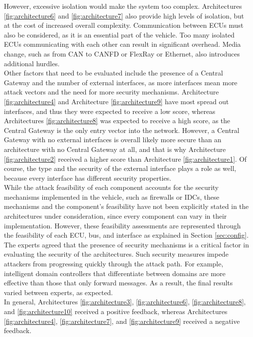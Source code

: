 However, excessive isolation would make the system too complex. 
Architectures \ref{fig:architecture6} and \ref{fig:architecture7} also provide high levels of isolation, but at the cost of increased overall complexity.
Communication between ECUs must also be considered, as it is an essential part of the vehicle. 
Too many isolated ECUs communicating with each other can result in significant overhead. 
Media change, such as from CAN to CANFD or FlexRay or Ethernet, also introduces additional hurdles.\\

Other factors that need to be evaluated include the presence of a Central Gateway and the number of external interfaces, 
as more interfaces mean more attack vectors and the need for more security mechanisms.
Architecture \ref{fig:architecture4} and Architecture \ref{fig:architecture9} have most spread out interfaces, and thus they were expected to receive a low score,
whereas Architectures \ref{fig:architecture8} was expected to receive a high score, as the Central Gateway is the only entry vector into the network.
However, a Central Gateway with no external interfaces is overall likely more secure than an architecture with no Central Gateway at all, and that is why 
Architecture \ref{fig:architecture2} received a higher score than Architecture \ref{fig:architecture1}. 
Of course, the type and the security of the external interface plays a role as well, because every interface has different security properties.\\

While the attack feasibility of each component accounts for the security mechanisms implemented in the vehicle, such as firewalls or IDCs, 
these mechanisms and the component's feasibility have not been explicitly stated in the architectures under consideration, since every component can vary in their implementation.
However, these feasibility assessments are represented through the feasibility of each ECU, bus, and interface as explained in Section \ref{sec:config}.
The experts agreed that the presence of security mechanisms is a critical factor in evaluating the security of the architectures.
Such security measures impede attackers from progressing quickly through the attack path. 
For example, intelligent domain controllers that differentiate between domains are more effective than those that only forward messages.
As a result, the final results varied between experts, as expected.\\

In general, Architectures \ref{fig:architecture3}, \ref{fig:architecture6}, \ref{fig:architecture8}, and \ref{fig:architecture10} received a positive feedback,
whereas Architectures \ref{fig:architecture4}, \ref{fig:architecture7}, and \ref{fig:architecture9} received a negative feedback.


